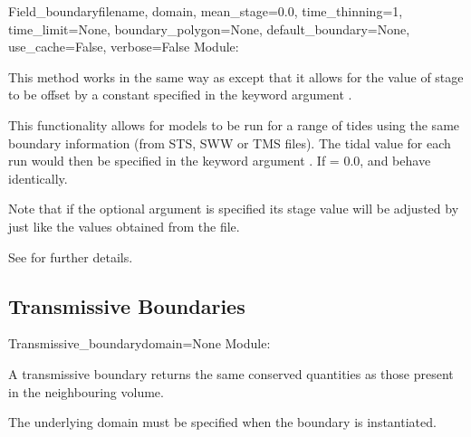 \documentclass{manual}
\begin{document}
\begin{classdesc}{Field_boundary}{filename,
                                  domain,
                                  mean_stage=0.0,
                                  time_thinning=1,
                                  time_limit=None,
                                  boundary_polygon=None,
                                  default_boundary=None,
                                  use_cache=False,
                                  verbose=False}
Module: 

This method works in the same way as  except that it
allows for the value of stage to be offset by a constant specified in the
keyword argument .

This functionality allows for models to be run for a range of tides using
the same boundary information (from STS, SWW or TMS files). The tidal value
for each run would then be specified in the keyword argument .
If  = 0.0,  and 
behave identically.

Note that if the optional argument  is specified
its stage value will be adjusted by  just like the values
obtained from the file.

See  for further details.
\end{classdesc}


\subsection{Transmissive Boundaries}

\begin{classdesc}{Transmissive_boundary}{domain=None}
  \label{pg: transmissive boundary}
Module: 

A transmissive boundary returns the same conserved quantities as
those present in the neighbouring volume.

The underlying domain must be specified when the boundary is instantiated.
\end{classdesc}
\end{document}
